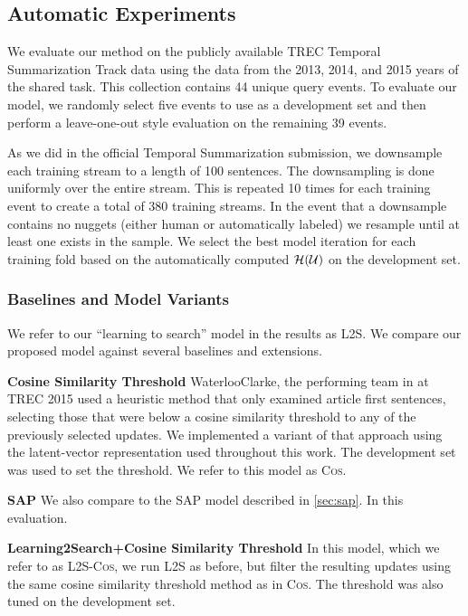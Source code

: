 \subsection{Automatic Experiments} We evaluate our method on the publicly
available TREC Temporal Summarization Track data using the data from the 2013,
2014, and 2015 years of the shared task. This collection contains  44 unique
query events.  To evaluate our model, we randomly select five events to use as
a development set and then perform a leave-one-out style evaluation on the
remaining 39 events.

As we did in the official Temporal Summarization submission,  we  downsample each
training stream to a length of 100 sentences. The downsampling is done
uniformly over the entire stream. This is repeated 10 times for each training
event to create a total of 380 training streams. In the event that a
downsample contains no nuggets (either human or automatically labeled) we
resample until at least one exists in the sample.  We select the best model
iteration for each training fold based on the automatically computed
$\mathcal{H}(\mathcal{U})$ on the development set.

\subsubsection{Baselines and Model Variants}

We refer to our ``learning to search'' model in the results as \textsc{L2S}.
We compare our proposed model against several baselines and extensions. 

\textbf{Cosine Similarity Threshold} WaterlooClarke, the performing team in at
TREC 2015 used a heuristic method that only examined article first sentences,
selecting those that were below a cosine similarity threshold to any of the
previously selected updates. We implemented a variant of that approach using
the latent-vector representation used throughout this work. The development
set was used to set the threshold. We refer to this model as \textsc{Cos}.
  
\textbf{SAP} We also compare to the SAP model described in \autoref{sec:sap}.
In this evaluation.

\textbf{Learning2Search+Cosine Similarity Threshold} In this model, which we
refer to as \textsc{L2S-Cos}, we run \textsc{L2S} as before, but filter the
resulting updates using the same cosine similarity threshold method as in
\textsc{Cos}. The threshold was also tuned on the development set. 
